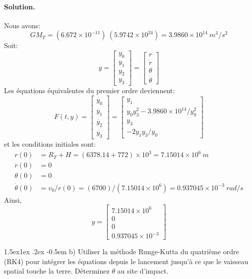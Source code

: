 \documentclass[%
oneside,                 %
final,                   %
10pt,french]{article}
\makeatletter
\newenvironment{doconceexercise}{}{}
\newcommand\subex{\@startsection{paragraph}{4}{\z@}%
                  {1.5ex\@plus1ex \@minus.2ex}%
                  {-0.5em}%
                  {\normalfont\normalsize\bfseries}}
\makeatother
\begin{document}
\begin{doconceexercise}
\paragraph{Solution.}
Nous avons:
$$ G M_T = (6.672 \times 10^{-11}) \ (5.9742 \times 10^{24}) = 3.9860 \times 10^{14} \ m^3/s^2 $$
Soit:
$$ y = \left[\begin{array}{c} y_0 \\ y_1 \\ y_2 \\ y_3 \end{array}\right] = \left[\begin{array}{c} r \\ \dot{r} \\ \theta \\ \dot{\theta} \end{array}\right]$$
Les équations équivalentes du premier ordre deviennent:
$$F(t, y) = \left[\begin{array}{c} \dot{y_0} \\ \dot{y_1} \\ \dot{y_2} \\ \dot{y_3} \end{array}\right] = \left[\begin{array}{c} y_1 \\ y_0 y_3^2 - 3.9860 \times 10^{14}/y_0^2 \\ y_3 \\ -2 y_1 y_3/y_0 \end{array}\right]$$
et les conditions initiales sont:
\begin{align*}
r(0) &= R_T + H = (6378.14 + 772) \times 10^{3} = 7.15014 \times 10^{6} \ m \\
\dot{r}(0) &= 0 \\
\theta (0) &= 0 \\
\dot{\theta}(0) &= v_0/r(0) = (6700)/(7.15014 \times 10^6) = 0.937045 \times 10^{-3} \ rad/s
\end{align*}
Ainsi,
$$ y = \left[\begin{array}{c} 7.15014 \times 10^{6} \\ 0 \\ 0 \\ 0.937045 \times 10^{-3} \end{array}\right]$$


\subex{b)}
Utiliser la méthode Runge-Kutta du quatrième ordre (RK4) pour intégrer les équations depuis le lancement jusqu'à ce que le vaisseau spatial touche la terre. Déterminez $\theta$ au site d'impact.



\end{doconceexercise}
\end{document}

